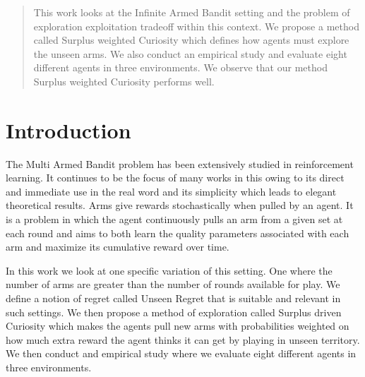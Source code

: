 \begin{abstract}
This work looks at the Infinite Armed Bandit setting and the problem of exploration exploitation tradeoff within this context. We propose a method called Surplus weighted Curiosity which defines how agents must explore the unseen arms. We also conduct an empirical study and evaluate eight different agents in three environments. We observe that our method Surplus weighted Curiosity performs well. 
\end{abstract}

\section{Introduction}

The Multi Armed Bandit problem has been extensively studied in reinforcement learning. It continues to be the focus of many works in this owing to its direct and immediate use in the real word and its simplicity which leads to elegant theoretical results. Arms give rewards stochastically when pulled by an agent. It is a problem in which the agent continuously pulls an arm from a given set at each round and aims to both learn the quality parameters associated with each arm and maximize its cumulative reward over time.  


In this work we look at one specific variation of this setting. One where the number of arms are greater than the number of rounds available for play. We define a notion of regret called Unseen Regret that is suitable and relevant in such settings. We then propose a method of exploration called Surplus driven Curiosity which makes the agents pull new arms with probabilities weighted on how much extra reward the agent thinks it can get by playing in unseen territory. We then conduct and empirical study where we evaluate eight different agents in three environments.